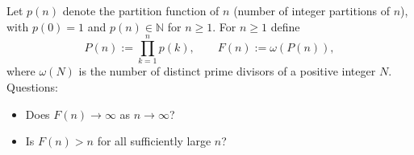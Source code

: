 Let $p(n)$ denote the partition function of $n$ (number of integer partitions of $n$), with $p(0)=1$ and $p(n)\in\mathbb N$ for $n\ge 1$.
For $n\ge 1$ define
\[P(n):=\prod_{k=1}^n p(k),\qquad F(n):=\omega(P(n)),
\]
where $\omega(N)$ is the number of distinct prime divisors of a positive integer $N$.
Questions:
\begin{itemize}
\item Does $F(n)\to\infty$ as $n\to\infty$?
\item Is $F(n)>n$ for all sufficiently large $n$?
\end{itemize}
